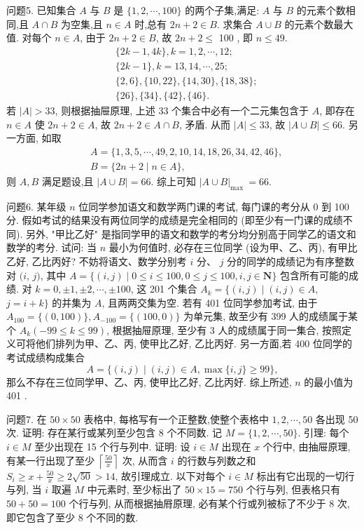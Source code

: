 问题5. 已知集合 $A$ 与 $B$ 是 $\{1,2, \cdots, 100\}$ 的两个子集,满足: $A$ 与 $B$ 的元素个数相同,且 $A \cap B$ 为空集,且 $n \in A$ 时,总有 $2 n+2 \in B$. 求集合 $A \cup B$ 的元素个数最大值.
对每个 $n \in A$, 由于 $2 n+2 \in B$, 故 $2 n+2 \leqslant$ 100 , 即 $n \leqslant 49$.
$$
\begin{aligned}
& \{2 k-1,4 k\}, k=1,2, \cdots, 12 ; \\
& \{2 k-1\}, k=13,14, \cdots, 25 ; \\
& \{2,6\},\{10,22\},\{14,30\},\{18,38\} ; \\
& \{26\},\{34\},\{42\},\{46\} .
\end{aligned}
$$
若 $|A|>33$, 则根据抽屉原理, 上述 33 个集合中必有一个二元集包含于 $A$, 即存在 $n \in A$ 使 $2 n+2 \in A$, 故 $2 n+2 \in A \cap B$, 矛盾.
从而 $|A| \leqslant 33$, 故 $|A \cup B| \leqslant 66$.
另一方面, 如取
$$
\begin{aligned}
& A=\{1,3,5, \cdots, 49,2,10,14,18,26,34,42,46\}, \\
& B=\{2 n+2 \mid n \in A\},
\end{aligned}
$$
则 $A, B$ 满足题设,且 $|A \cup B|=66$.
综上可知 $|A \cup B|_{\text {max }}=66$.



问题6. 某年级 $n$ 位同学参加语文和数学两门课的考试, 每门课的考分从 0 到 100 分.
假如考试的结果没有两位同学的成绩是完全相同的 (即至少有一门课的成绩不同). 另外, "甲比乙好" 是指同学甲的语文和数学的考分均分别高于同学乙的语文和数学的考分.
试问: 当 $n$ 最小为何值时, 必存在三位同学 (设为甲、乙、丙), 有甲比乙好, 乙比丙好?
不妨将语文、数学分别考 $i$ 分、 $j$ 分的同学的成绩记为有序整数对 $(i$, $j)$, 其中 $A=\{(i, j) \mid 0 \leqslant i \leqslant 100,0 \leqslant j \leqslant 100, i, j \in \mathbf{N}\}$ 包含所有可能的成绩.
对 $k=0, \pm 1, \pm 2, \cdots, \pm 100$, 这 201 个集合 $A_k=\{(i, j) \mid(i, j) \in A$, $j=i+k\}$ 的并集为 $A$, 且两两交集为空.
若有 401 位同学参加考试, 由于 $A_{100}=\{(0,100)\}, A_{-100}=\{(100,0)\}$ 为单元集, 故至少有 399 人的成绩属于某个 $A_k(-99 \leqslant k \leqslant 99)$, 根据抽屉原理, 至少有 3 人的成绩属于同一集合, 按照定义可将他们排列为甲、乙、丙, 使甲比乙好, 乙比丙好.
另一方面,若 400 位同学的考试成绩构成集合
$$
A=\{(i, j) \mid(i, j) \in A, \max \{i, j\} \geqslant 99\},
$$
那么不存在三位同学甲、乙、丙, 使甲比乙好, 乙比丙好.
综上所述, $n$ 的最小值为 401 .



问题7. 在 $50 \times 50$ 表格中, 每格写有一个正整数,使整个表格中 $1,2, \cdots, 50$ 各出现 50 次.
证明: 存在某行或某列至少包含 8 个不同数.
记 $M=\{1,2, \cdots, 50\}$.
引理: 每个 $i \in M$ 至少出现在 15 个行与列中.
证明: 设 $i \in M$ 出现在 $x$ 个行中, 由抽屉原理, 有某一行出现了至少 $\left\lceil\frac{50}{x}\right\rceil$ 次, 从而含 $i$ 的行数与列数之和 $S_i \geqslant x+\frac{50}{x} \geqslant 2 \sqrt{50}>14$, 故引理成立.
以下对每个 $i \in M$ 标出有它出现的一切行与列, 当 $i$ 取遍 $M$ 中元素时, 至少标出了 $50 \times 15=750$ 个行与列, 但表格只有 $50+50=100$ 个行与列, 从而根据抽㞕原理, 必有某个行或列被标了不少于 8 次, 即它包含了至少 8 个不同的数.



